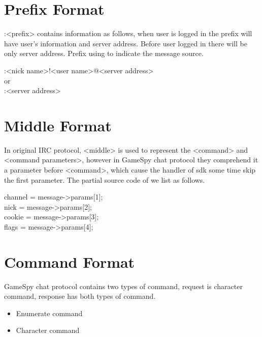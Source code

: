 \documentclass[oneside,titlepage,a4paper]{Definition/retrospy} %
\begin{document}
\section{Prefix Format}
:<prefix> contains information as follows, when user is logged in the prefix will have user's information and server address. Before user logged in there will be only server address. Prefix using to indicate the message source.
\begin{mybox}
	:<nick name>!<user name>@<server address>\\
	or\\
	:<server address>
\end{mybox}
\section{Middle Format}
In original IRC protocol, <middle> is used to represent the <command> and <command parameters>, however in GameSpy chat protocol they comprehend it a parameter before <command>, which cause the handler of sdk some time skip the first parameter. The partial source code of  we list as follows.
\begin{mybox}
	channel = message->params[1];\\
	nick = message->params[2];\\
	cookie = message->params[3];\\
	flags = message->params[4];
\end{mybox}


\section{Command Format}
GameSpy chat protocol contains two types of command, request is character command, response has both types of command.
\begin{itemize}
	\item Enumerate command
	\item Character command
\end{itemize}
\end{document}
